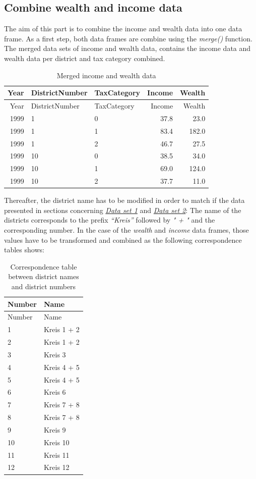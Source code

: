 \documentclass[
]{article}
\begin{document}
\newpage

\hypertarget{combine-wealth-and-income-data}{%
\subsection{Combine wealth and income
data}\label{combine-wealth-and-income-data}}

The aim of this part is to combine the income and wealth data into one
data frame. As a first step, both data frames are combine using the
\emph{merge()} function. The merged data sets of income and wealth data,
contains the income data and wealth data per district and tax category
combined.

\begin{longtable}[]{@{}rllrr@{}}
\caption{Merged income and wealth data}\tabularnewline
\toprule
Year & DistrictNumber & TaxCategory & Income & Wealth\tabularnewline
\midrule
\endfirsthead
\toprule
Year & DistrictNumber & TaxCategory & Income & Wealth\tabularnewline
\midrule
\endhead
1999 & 1 & 0 & 37.8 & 23.0\tabularnewline
1999 & 1 & 1 & 83.4 & 182.0\tabularnewline
1999 & 1 & 2 & 46.7 & 27.5\tabularnewline
1999 & 10 & 0 & 38.5 & 34.0\tabularnewline
1999 & 10 & 1 & 69.0 & 124.0\tabularnewline
1999 & 10 & 2 & 37.7 & 11.0\tabularnewline
\bottomrule
\end{longtable}

Thereafter, the district name has to be modified in order to match if
the data presented in sections concerning
\emph{\protect\hyperlink{Dataux5cux2520setux5cux25201:ux5cux2520Turnoutux5cux2520atux5cux2520theux5cux2520cityux5cux2520andux5cux2520municipalux5cux2520councilux5cux2520electionsux5cux2520sinceux5cux25202006ux2cux5cux2520byux5cux2520cityux5cux2520district.}{Data
set 1}} and
\emph{\protect\hyperlink{Dataux5cux2520setux5cux25202:ux5cux2520Municipalux5cux2520electionsux5cux2520voteux5cux2520shareux2cux5cux2520byux5cux2520partyux5cux2520andux5cux2520electoralux5cux2520districtux5cux2520sinceux5cux25201913.}{Data
set 2}}: The name of the districts corresponds to the prefix
\emph{``Kreis''} followed by \emph{" + "} and the corresponding number.
In the case of the \emph{wealth} and \emph{income} data frames, those
values have to be transformed and combined as the following
correspondence tables shows:

\begin{longtable}[]{@{}ll@{}}
\caption{Correspondence table between district names and district
numbers}\tabularnewline
\toprule
Number & Name\tabularnewline
\midrule
\endfirsthead
\toprule
Number & Name\tabularnewline
\midrule
\endhead
1 & Kreis 1 + 2\tabularnewline
2 & Kreis 1 + 2\tabularnewline
3 & Kreis 3\tabularnewline
4 & Kreis 4 + 5\tabularnewline
5 & Kreis 4 + 5\tabularnewline
6 & Kreis 6\tabularnewline
7 & Kreis 7 + 8\tabularnewline
8 & Kreis 7 + 8\tabularnewline
9 & Kreis 9\tabularnewline
10 & Kreis 10\tabularnewline
11 & Kreis 11\tabularnewline
12 & Kreis 12\tabularnewline
\bottomrule
\end{longtable}
\end{document}
